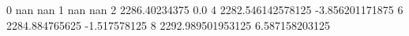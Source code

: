 0 nan nan
1 nan nan
2 2286.40234375 0.0
4 2282.546142578125 -3.856201171875
6 2284.884765625 -1.517578125
8 2292.989501953125 6.587158203125
